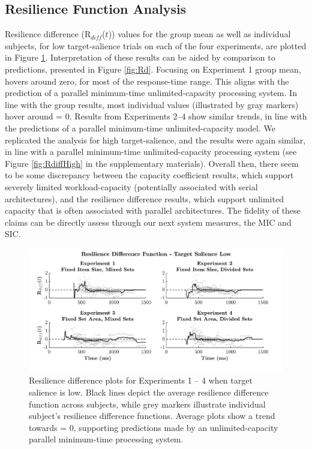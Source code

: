 \subsection{Resilience Function Analysis} 
Resilience difference (R$_{diff}$($t$)) values for the group mean as well as individual subjects, for low target-salience trials on each of the four experiments, are plotted in Figure \ref{fig:RdiffLow}. Interpretation of these results can be aided by comparison to \Rd predictions, presented in Figure \ref{fig:Rd}. Focusing on Experiment 1 group mean, \Rd hovers around zero, for most of the response-time range. This aligns with the prediction of a parallel minimum-time unlimited-capacity processing system. 
In line with the group results, most individual \Rd values (illustrated by gray markers) hover around \Rd = 0. Results from Experiments 2--4 show similar trends, in line with the predictions of a parallel minimum-time unlimited-capacity model. We replicated the \Rd analysis for high target-salience, and the results were again similar, in line with a parallel minimum-time unlimited-capacity processing system (see Figure \ref{fig:RdiffHigh} in the supplementary materials). Overall then, there seem to be some discrepancy between the capacity coefficient results, which support severely limited workload-capacity (potentially associated with serial architectures), and the resilience difference results, which support unlimited capacity that is often associated with parallel architectures. The fidelity of these claims can be directly assess through our next system measures, the MIC and SIC. 

\begin{figure}[tbh]
\centering \includegraphics[width=\linewidth]{Figures/EstSystems/FIG9JPG.pdf}
\caption{Resilience difference plots for Experiments 1 – 4 when target salience is low. Black lines depict the average resilience difference function across subjects, while grey markers illustrate individual subject’s resilience difference functions. Average plots show a trend towards \Rd = 0, supporting predictions made by an unlimited-capacity parallel minimum-time processing system.}
\label{fig:RdiffLow}
\end{figure}


